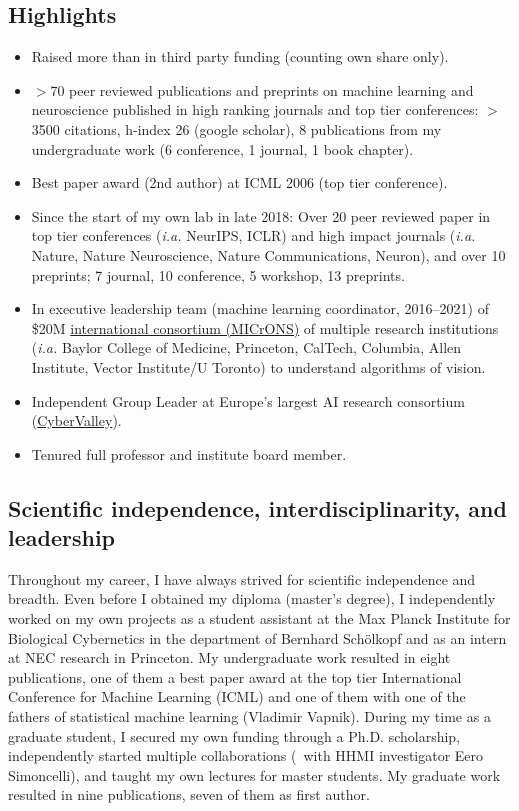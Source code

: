 \documentclass[COG,11pt]{ercgrant}
\begin{document}
\subsection{Highlights}
\begin{itemize}
    \item Raised more than  in third party funding (counting own share only).
    \item $>70$ peer reviewed publications and preprints on machine learning and neuroscience published in high ranking journals and top tier conferences: $>$3500 citations, h-index 26 (google scholar), 8 publications from my undergraduate work (6 conference, 1 journal, 1 book chapter).
    \item Best paper award (2nd author) at ICML 2006 (top tier conference).
    \item Since the start of my own lab in late 2018: Over 20 peer reviewed paper in top tier conferences (\textit{i.a.} NeurIPS, ICLR) and high impact journals (\textit{i.a.} Nature, Nature Neuroscience, Nature Communications, Neuron), and over 10 preprints; 7 journal, 10  conference, 5 workshop, 13 preprints.
    \item In executive leadership team (machine learning coordinator, 2016--2021) of \$20M \href{https://www.ninai.org/}{international consortium (MICrONS)} of multiple research institutions (\textit{i.a.} Baylor College of Medicine, Princeton, CalTech, Columbia, Allen Institute, Vector Institute/U Toronto) to understand algorithms of vision.
    \item Independent Group Leader at Europe's largest AI research consortium (\href{https://cyber-valley.de/}{CyberValley}).
    \item Tenured full professor and institute board member. 
\end{itemize}

\subsection{Scientific independence, interdisciplinarity, and leadership}
Throughout my career, I have always strived for scientific independence and breadth. Even before I obtained my diploma (master's degree), I independently worked on my own  projects as a student assistant at the Max Planck Institute for Biological Cybernetics in the department of Bernhard Schölkopf and as an intern at NEC research in Princeton. My undergraduate work resulted in eight publications, one of them a best paper award at the top tier International Conference for Machine Learning (ICML) and one of them with one of the fathers of statistical machine learning (Vladimir Vapnik). During my time as a graduate student, I secured my own funding through a Ph.D. scholarship, independently started multiple collaborations (\eg~with HHMI investigator Eero Simoncelli), and taught my own lectures for master students. My graduate work resulted in nine publications, seven of them as first author. 
\end{document}
